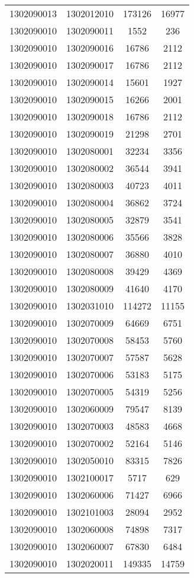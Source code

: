 \begin{longtable}{llcc}
1302090013 & 1302012010 & 173126 & 16977\\
1302090010 & 1302090011 & 1552 & 236\\
1302090010 & 1302090016 & 16786 & 2112\\
1302090010 & 1302090017 & 16786 & 2112\\
1302090010 & 1302090014 & 15601 & 1927\\
1302090010 & 1302090015 & 16266 & 2001\\
1302090010 & 1302090018 & 16786 & 2112\\
1302090010 & 1302090019 & 21298 & 2701\\
1302090010 & 1302080001 & 32234 & 3356\\
1302090010 & 1302080002 & 36544 & 3941\\
1302090010 & 1302080003 & 40723 & 4011\\
1302090010 & 1302080004 & 36862 & 3724\\
1302090010 & 1302080005 & 32879 & 3541\\
1302090010 & 1302080006 & 35566 & 3828\\
1302090010 & 1302080007 & 36880 & 4010\\
1302090010 & 1302080008 & 39429 & 4369\\
1302090010 & 1302080009 & 41640 & 4170\\
1302090010 & 1302031010 & 114272 & 11155\\
1302090010 & 1302070009 & 64669 & 6751\\
1302090010 & 1302070008 & 58453 & 5760\\
1302090010 & 1302070007 & 57587 & 5628\\
1302090010 & 1302070006 & 53183 & 5175\\
1302090010 & 1302070005 & 54319 & 5256\\
1302090010 & 1302060009 & 79547 & 8139\\
1302090010 & 1302070003 & 48583 & 4668\\
1302090010 & 1302070002 & 52164 & 5146\\
1302090010 & 1302050010 & 83315 & 7826\\
1302090010 & 1302100017 & 5717 & 629\\
1302090010 & 1302060006 & 71427 & 6966\\
1302090010 & 1302101003 & 28094 & 2952\\
1302090010 & 1302060008 & 74898 & 7317\\
1302090010 & 1302060007 & 67830 & 6484\\
1302090010 & 1302020011 & 149335 & 14759\\

\end{longtable}
